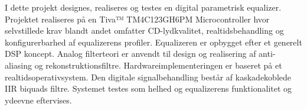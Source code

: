 I dette projekt designes, realiseres og testes en digital parametrisk equalizer. Projektet realiseres på en Tiva™ TM4C123GH6PM Microcontroller hvor selvstillede krav blandt andet omfatter CD-lydkvalitet, realtidsbehandling og konfigurerbarhed af equalizerens profiler. Equalizeren er opbygget efter et generelt DSP koncept. Analog filterteori er anvendt til design og realisering af anti-aliasing og rekonstruktionsfiltre. Hardwareimplementeringen er baseret på et realtidsoperativsystem. Den digitale signalbehandling består af kaskadekoblede IIR biquads filtre. Systemet testes som helhed og equalizerens funktionalitet og ydeevne eftervises. 